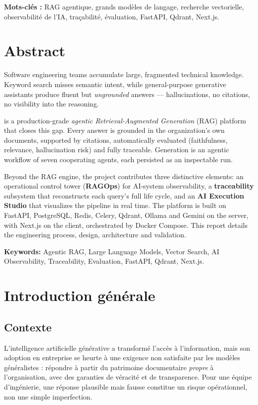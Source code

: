 \noindent\textbf{Mots-clés :} RAG agentique, grands modèles de langage, recherche
vectorielle, observabilité de l'IA, traçabilité, évaluation, FastAPI, Qdrant,
Next.js.

\chapter*{Abstract}

Software engineering teams accumulate large, fragmented technical knowledge.
Keyword search misses semantic intent, while general-purpose generative
assistants produce fluent but \emph{ungrounded} answers — hallucinations, no
citations, no visibility into the reasoning.

\devpilot{} is a production-grade \emph{agentic Retrieval-Augmented Generation}
(RAG) platform that closes this gap. Every answer is grounded in the
organization's own documents, supported by citations, automatically evaluated
(faithfulness, relevance, hallucination risk) and fully traceable. Generation is
an agentic workflow of seven cooperating agents, each persisted as an inspectable
run.

Beyond the RAG engine, the project contributes three distinctive elements: an
operational control tower (\textbf{RAGOps}) for AI-system observability, a
\textbf{traceability} subsystem that reconstructs each query's full life cycle,
and an \textbf{AI Execution Studio} that visualizes the pipeline in real time.
The platform is built on FastAPI, PostgreSQL, Redis, Celery, Qdrant, Ollama and
Gemini on the server, with Next.js on the client, orchestrated by Docker Compose.
This report details the engineering process, design, architecture and validation.

\noindent\textbf{Keywords:} Agentic RAG, Large Language Models, Vector Search, AI
Observability, Traceability, Evaluation, FastAPI, Qdrant, Next.js.

\chapter*{Introduction générale}

\section*{Contexte}
L'intelligence artificielle générative a transformé l'accès à l'information, mais
son adoption en entreprise se heurte à une exigence non satisfaite par les
modèles généralistes : répondre à partir du patrimoine documentaire
\emph{propre} à l'organisation, avec des garanties de véracité et de
transparence. Pour une équipe d'ingénierie, une réponse plausible mais fausse
constitue un risque opérationnel, non une simple imperfection.

